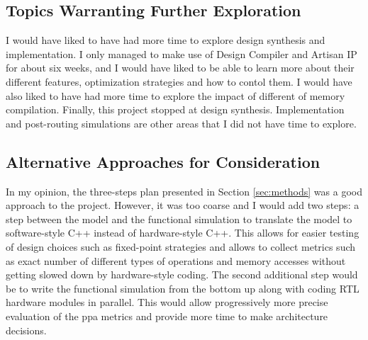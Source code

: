 \subsection{Topics Warranting Further Exploration}
I would have liked to have had more time to explore design synthesis and implementation. I only managed to make use of Design Compiler and Artisan IP for about six weeks, and I would have
liked to be able to learn more about their different features, optimization strategies and how to contol them. I would have also liked to have had more time to explore the impact of different
of memory compilation. Finally, this project stopped at design synthesis. Implementation and post-routing simulations are other areas that I did not have time to explore.

\subsection{Alternative Approaches for Consideration}
In my opinion, the three-steps plan presented in Section \ref{sec:methods} was a good approach to the project. However, it was too coarse and I would add two steps: a step between the model
and the functional simulation to translate the model to software-style C++ instead of hardware-style C++. This allows for easier testing of design choices such as fixed-point strategies and
allows to collect metrics such as exact number of different types of operations and memory accesses without getting slowed down by hardware-style coding. The second additional step would be to
write the functional simulation from the bottom up along with coding RTL hardware modules in parallel. This would allow progressively more precise evaluation of the \ac{ppa} metrics and provide
more time to make architecture  decisions.